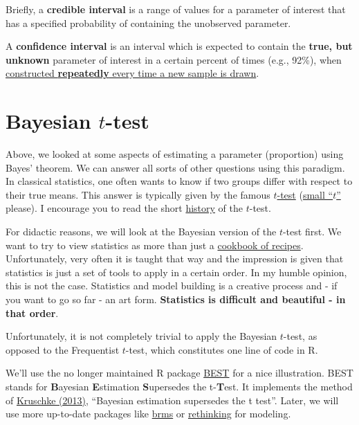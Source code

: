 \documentclass[
]{book}
\begin{document}
Briefly, a \textbf{credible interval} is a range of values
for a parameter of interest that has a specified probability of containing the
unobserved parameter.

A \textbf{confidence interval} is an interval which is expected to contain the \textbf{true,
but unknown} parameter of interest in a certain percent of times (e.g., 92\%), when
\href{https://en.wikipedia.org/wiki/Confidence_interval\#/media/File:Normal_distribution_50\%25_CI_illustration.svg}{constructed \textbf{repeatedly} every time a new sample is drawn}.

\section{\texorpdfstring{Bayesian \(t\)-test}{Bayesian t-test}}\label{bayesian_t_test}

Above, we looked at some aspects of estimating a parameter (proportion) using Bayes' theorem.
We can answer all sorts of other questions using this paradigm. In classical statistics,
one often wants to know if two groups differ with respect to their true means.
This answer is typically given by the famous \href{https://en.wikipedia.org/wiki/Student\%27s_t-test}{\(t\)-test}
(\href{https://pure.manchester.ac.uk/ws/portalfiles/portal/78743532/studentt.pdf}{small ``\(t\)''} please).
I encourage you to read the short \href{https://en.wikipedia.org/wiki/Student\%27s_t-test\#History}{history} of the \(t\)-test.

For didactic reasons, we will look at the Bayesian version of the \(t\)-test first.
We want to try to view statistics as more than just a
\href{https://www.methodenberatung.uzh.ch/de/datenanalyse_spss.html}{cookbook of recipes}.
Unfortunately, very often it is taught that way and the impression is given that statistics is
just a set of tools to apply in a certain order. In my humble opinion, this is not the case. Statistics
and model building is a creative process and - if you want to go so far - an art form.
\textbf{Statistics is difficult and beautiful - in that order}.

Unfortunately, it is not completely trivial to apply the Bayesian \(t\)-test,
as opposed to the Frequentist \(t\)-test,
which constitutes one line of code in R.

We'll use the no longer maintained R package \href{https://cran.r-project.org/web/packages/BEST/index.html}{BEST}
for a nice illustration. BEST stands for \textbf{B}ayesian \textbf{E}stimation \textbf{S}upersedes the t-\textbf{T}est.
It implements the method of \href{https://doi.org/10.1037/a0029146}{Kruschke (2013)}, ``Bayesian estimation supersedes the t test''.
Later, we will use more up-to-date packages like \href{https://cran.r-project.org/web/packages/brms/index.html}{brms}
or \href{https://github.com/rmcelreath/rethinking}{rethinking} for modeling.
\end{document}
